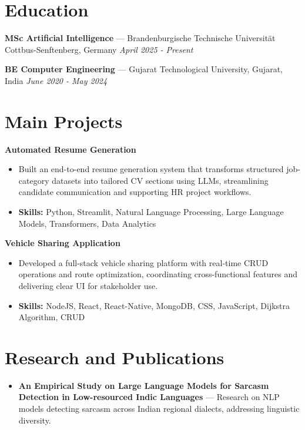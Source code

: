 \documentclass[a4paper,10pt]{article}
\begin{document}
\section*{Education}
\textbf{MSc Artificial Intelligence} — Brandenburgische Technische Universität Cottbus-Senftenberg, Germany \hfill \textit{April 2025 - Present}\par
\vspace{1.5pt}
\textbf{BE Computer Engineering} — Gujarat Technological University, Gujarat, India \hfill \textit{June 2020 - May 2024}\par

\section*{Main Projects}
\textbf{Automated Resume Generation}\par
\vspace{1pt}
\begin{itemize}
  \item Built an end-to-end resume generation system that transforms structured job-category datasets into tailored CV sections using LLMs, streamlining candidate communication and supporting HR project workflows.
  \item \textbf{Skills:} Python, Streamlit, Natural Language Processing, Large Language Models, Transformers, Data Analytics
\end{itemize}
\vspace{3pt}
\textbf{Vehicle Sharing Application}\par
\vspace{1pt}
\begin{itemize}
  \item Developed a full-stack vehicle sharing platform with real-time CRUD operations and route optimization, coordinating cross-functional features and delivering clear UI for stakeholder use.
  \item \textbf{Skills:} NodeJS, React, React-Native, MongoDB, CSS, JavaScript, Dijkstra Algorithm, CRUD
\end{itemize}

\section*{Research and Publications}
\begin{itemize}
\item \textbf{An Empirical Study on Large Language Models for Sarcasm Detection in Low-resourced Indic Languages} — Research on NLP models detecting sarcasm across Indian regional dialects, addressing linguistic diversity.
\end{itemize}
\end{document}

